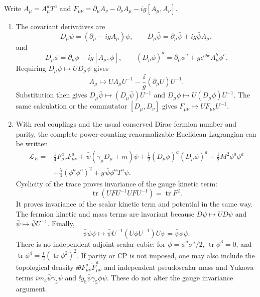 \begin{enumerate}
  Write \(A_\mu=A_\mu^aT^a\) and
  \(F_{\mu\nu}=\partial_\mu A_\nu-\partial_\nu A_\mu
  -ig[A_\mu,A_\nu]\).
  \begin{enumerate}
    \item[(a)] The covariant derivatives are
      \[
        D_\mu\psi=(\partial_\mu-igA_\mu)\psi,
        \qquad
        D_\mu\bar\psi=\partial_\mu\bar\psi+ig\bar\psi A_\mu,
      \]
      and
      \[
        D_\mu\phi=\partial_\mu\phi-ig[A_\mu,\phi],
        \qquad
        (D_\mu\phi)^a=\partial_\mu\phi^a
          +g\epsilon^{abc}A_\mu^b\phi^c.
      \]
      Requiring \(D_\mu\psi\mapsto U D_\mu\psi\) gives
      \[
        \boxed{A_\mu\longmapsto
          UA_\mu U^{-1}-\frac{\ii}{g}(\partial_\mu U)U^{-1}.}
      \]
      Substitution then gives
      \(D_\mu\bar\psi\mapsto(D_\mu\bar\psi)U^{-1}\) and
      \(D_\mu\phi\mapsto U(D_\mu\phi)U^{-1}\).  The same calculation or
      the commutator \([D_\mu,D_\nu]\) gives
      \(F_{\mu\nu}\mapsto UF_{\mu\nu}U^{-1}\).

    \item[(b)] With real couplings and the usual conserved Dirac fermion
      number and parity, the complete power-counting-renormalizable
      Euclidean Lagrangian can be written
      \[
        \begin{split}
        \mathcal L_E={}&\frac14F^a_{\mu\nu}F^a_{\mu\nu}
          +\bar\psi(\gamma_\mu D_\mu+m)\psi
          +\frac12(D_\mu\phi)^a(D_\mu\phi)^a
          +\frac12M^2\phi^a\phi^a\\
          &+\frac\lambda4(\phi^a\phi^a)^2
          +y\,\bar\psi\phi^aT^a\psi .
        \end{split}
      \]
      Cyclicity of the trace proves invariance of the gauge kinetic term:
      \[
        \operatorname{tr}(UFU^{-1}UFU^{-1})
          =\operatorname{tr}F^2.
      \]
      It proves invariance of the scalar kinetic term and potential in the
      same way.  The fermion kinetic and mass
      terms are invariant because \(D\psi\mapsto UD\psi\) and
      \(\bar\psi\mapsto\bar\psi U^{-1}\).  Finally,
      \[
        \bar\psi\phi\psi\longmapsto
        \bar\psi U^{-1}(U\phi U^{-1})U\psi
        =\bar\psi\phi\psi.
      \]
      There is no independent adjoint-scalar cubic: for
      \(\phi=\phi^a\sigma^a/2\),
      \(\operatorname{tr}\phi^3=0\), and
      \(\operatorname{tr}\phi^4=\tfrac12(\operatorname{tr}\phi^2)^2\).
      If parity or CP is not imposed, one may also include the topological
      density \(\ii\theta F^a_{\mu\nu}\widetilde F^a_{\mu\nu}\) and
      independent pseudoscalar mass and Yukawa terms
      \(i m_5\bar\psi\gamma_5\psi\) and
      \(\ii y_5\bar\psi\gamma_5\phi\psi\).  These do not alter the gauge
      invariance argument.


\end{enumerate}
\end{enumerate}
